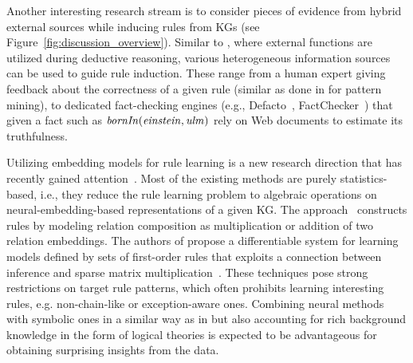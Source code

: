 Another interesting research stream is to consider pieces of evidence from hybrid external sources while inducing rules from KGs
(see Figure~\ref{fig:discussion_overview}). Similar to \cite{DBLP:conf/rweb/EiterKRSW17}, where external functions are utilized during deductive reasoning, various heterogeneous information sources can be used to guide rule induction. These range from a human expert giving feedback about the correctness of a given rule (similar as done in \cite{Dzyuba2017} for pattern mining), to dedicated fact-checking engines (e.g., Defacto~\cite{defacto}, FactChecker~\cite{factchecker}) that given a fact such as $\mathit{bornIn(einstein,ulm)}$ rely on Web documents to estimate its truthfulness. 


 Utilizing embedding models for rule learning is a new research direction that has recently gained attention~\cite{DBLP:conf/nips/YangYC17,DBLP:journals/corr/YangYHGD14a}. Most of the existing methods are purely statistics-based, i.e., they reduce the rule learning problem to algebraic operations on neural-embedding-based representations of a given KG. The approach~\cite{DBLP:journals/corr/YangYHGD14a} constructs rules by modeling relation composition as multiplication or addition of two relation embeddings. The authors of \cite{DBLP:conf/nips/YangYC17} propose a differentiable system for learning models defined by sets of first-order rules that exploits a connection between inference and sparse matrix multiplication~\cite{DBLP:journals/corr/Cohen16b}. These techniques pose strong restrictions on target rule patterns, which often prohibits learning interesting rules, e.g. non-chain-like or exception-aware ones. Combining neural methods with symbolic ones in a similar way as in \cite{thinh2018} but also accounting for rich background knowledge in the form of logical theories is expected to be advantageous for obtaining surprising insights from the data. 

